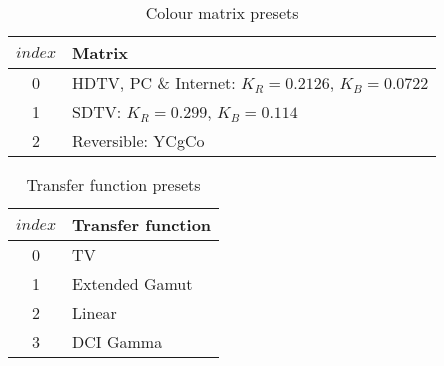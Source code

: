 \begin{table}[!ht]
\centering
\begin{tabular}{|c|l|}
\hline
$index$ &  {\bf Matrix}\\
\hline
0 & HDTV, PC \& Internet: $K_R=0.2126$, $K_B=0.0722$ \\ 
\hline
1 & SDTV: $K_R=0.299$, $K_B=0.114$ \\
\hline
2 & Reversible: YCgCo \\
\hline
\end{tabular}
\caption{Colour matrix presets}\label{table:matrixvalues}
\end{table}

\begin{table}[!ht]
\centering
\begin{tabular}{|c|l|}
\hline
$index$ & {\bf Transfer function}\\
\hline
0 & TV \\ 
\hline
1 & Extended Gamut \\
\hline
2 & Linear\\
\hline
3 & DCI Gamma\\
\hline
\end{tabular}
\caption{Transfer function presets}\label{table:transfervalues}
\end{table}



